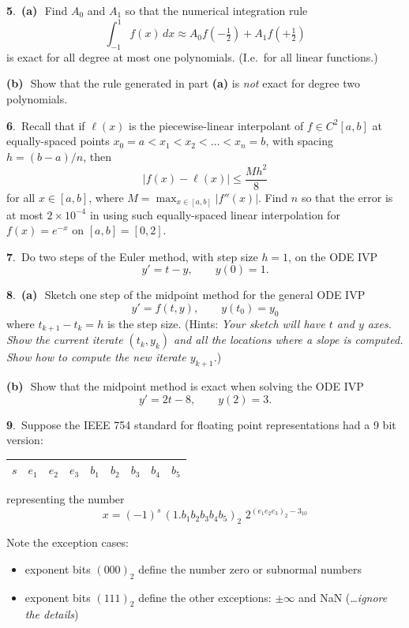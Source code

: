 \documentclass[11pt]{amsart}
\newcommand{\prob}[1]{\bigskip\noindent\large\textbf{#1}.\,\normalsize }
\newcommand{\ppart}[1]{\textbf{(#1)}\,\, }
\newcommand{\epart}[1]{\medskip\noindent\textbf{(#1)}\,\, }
\newcommand{\pts}[1]{}
\begin{document}
\newpage
\prob{5}  \ppart{a} \pts{10}  Find $A_0$ and $A_1$ so that the numerical integration rule
	$$\int_{-1}^1 f(x)\,dx \approx A_0 f(-\tfrac{1}{2}) + A_1 f(+\tfrac{1}{2})$$
is exact for all degree at most one polynomials.  (I.e.~for all linear functions.)
\vfill

\epart{b} \pts{10} Show that the rule generated in part \textbf{(a)} is \emph{not} exact for degree two polynomials.
\vfill

\prob{6}  \pts{10}  Recall that if $\ell(x)$ is the piecewise-linear interpolant of $f \in C^2[a,b]$ at equally-spaced points $x_0=a<x_1<x_2<\dots<x_n=b$, with spacing $h=(b-a)/n$, then
	$$|f(x) - \ell(x)| \le \frac{Mh^2}{8}$$
for all $x\in[a,b]$, where $M=\max_{x\in[a,b]}|f''(x)|$.  Find $n$ so that the error is at most $2 \times 10^{-4}$ in using such equally-spaced linear interpolation for $f(x)=e^{-x}$ on $[a,b]=[0,2]$.
\vfill


\newpage
\prob{7} \pts{10}  Do two steps of the Euler method, with step size $h=1$, on the ODE IVP
	$$y' = t - y, \qquad y(0)=1.$$
\vfill

\prob{8} \ppart{a} \pts{10}  Sketch one step of the midpoint method for the general ODE IVP
	$$y' = f(t,y), \qquad y(t_0)=y_0$$
where $t_{k+1}-t_k = h$ is the step size.
(Hints:  \emph{Your sketch will have $t$ and $y$ axes.  Show the current iterate $(t_k,y_k)$ and all the locations where a slope is computed.  Show how to compute the new iterate $y_{k+1}$.})
\vfill

\epart{b} \pts{3}  Show that the midpoint method is exact when solving the ODE IVP
	$$y' = 2 t - 8, \qquad y(2)=3.$$
\vspace{1.5in}


\newpage
\prob{9} \pts{10}  Suppose the IEEE 754 standard for floating point representations had a 9 bit version:

\medskip\large
\begin{center}
\begin{tabular}{|c|c|c|c|c|c|c|c|c|} \hline
$s$ & $e_1$ & $e_2$ & $e_3$ & $b_1$ & $b_2$ & $b_3$ & $b_4$ & $b_5$ \\ \hline
\end{tabular}
\end{center}
\medskip\normalsize

\noindent representing the number
\medskip\large
	$$x = (-1)^s\,(1.b_1 b_2 b_3 b_4 b_5)_2 \,\, 2^{(e_1 e_2 e_3)_2 - 3_{10}}$$
\normalsize

\noindent Note the exception cases:
\begin{itemize}
\item exponent bits $(000)_2$ define the number zero or subnormal numbers
\item exponent bits $(111)_2$ define the other exceptions: $\pm\infty$ and NaN (\emph{\dots ignore the details})
\end{itemize}
\end{document}
